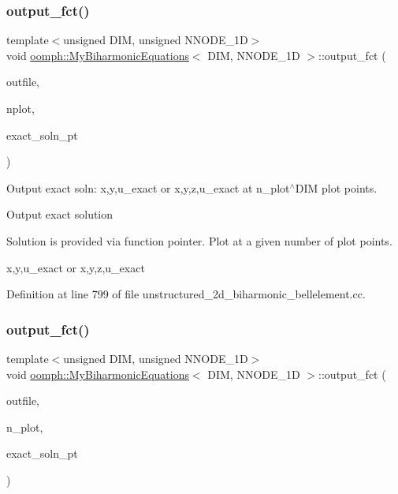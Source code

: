 \subsubsection{\texorpdfstring{output\+\_\+fct()}{output\_fct()}\hspace{0.1cm}{\footnotesize\ttfamily [1/4]}}
{\footnotesize\ttfamily template$<$unsigned D\+IM, unsigned N\+N\+O\+D\+E\+\_\+1D$>$ \\
void \hyperlink{classoomph_1_1MyBiharmonicEquations}{oomph\+::\+My\+Biharmonic\+Equations}$<$ D\+IM, N\+N\+O\+D\+E\+\_\+1D $>$\+::output\+\_\+fct (\begin{DoxyParamCaption}\item[{std\+::ostream \&}]{outfile,  }\item[{const unsigned \&}]{nplot,  }\item[{Finite\+Element\+::\+Steady\+Exact\+Solution\+Fct\+Pt}]{exact\+\_\+soln\+\_\+pt }\end{DoxyParamCaption})}



Output exact soln\+: x,y,u\+\_\+exact or x,y,z,u\+\_\+exact at n\+\_\+plot$^\wedge$\+D\+IM plot points. 

Output exact solution

Solution is provided via function pointer. Plot at a given number of plot points.

x,y,u\+\_\+exact or x,y,z,u\+\_\+exact 

Definition at line 799 of file unstructured\+\_\+2d\+\_\+biharmonic\+\_\+bellelement.\+cc.

\mbox{\label{classoomph_1_1MyBiharmonicEquations_a0f45f28eae4d25ddd9e53a769c3626a3}} 
\subsubsection{\texorpdfstring{output\+\_\+fct()}{output\_fct()}\hspace{0.1cm}{\footnotesize\ttfamily [2/4]}}
{\footnotesize\ttfamily template$<$unsigned D\+IM, unsigned N\+N\+O\+D\+E\+\_\+1D$>$ \\
void \hyperlink{classoomph_1_1MyBiharmonicEquations}{oomph\+::\+My\+Biharmonic\+Equations}$<$ D\+IM, N\+N\+O\+D\+E\+\_\+1D $>$\+::output\+\_\+fct (\begin{DoxyParamCaption}\item[{std\+::ostream \&}]{outfile,  }\item[{const unsigned \&}]{n\+\_\+plot,  }\item[{Finite\+Element\+::\+Steady\+Exact\+Solution\+Fct\+Pt}]{exact\+\_\+soln\+\_\+pt }\end{DoxyParamCaption})}



